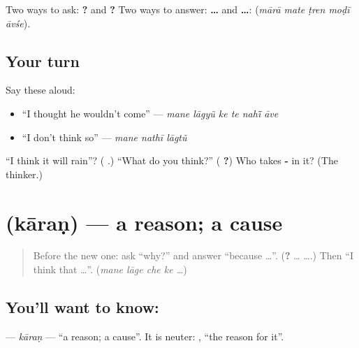Two ways to ask: \textbf{   ?} and \textbf{   ?} Two ways to answer: \textbf{    …} and \textbf{  …}: \textbf{    } (\emph{mārā mate ṭren moḍī āvśe}).

\subsection*{Your turn}
Say these aloud:

\begin{itemize}
\raggedright
  \item \textquotedblleft{}I thought he wouldn't come\textquotedblright{} — \emph{mane lāgyũ ke te nahī̃ āve}
  \item \textquotedblleft{}I don't think so\textquotedblright{} — \emph{mane nathī lāgtũ}
\end{itemize}

\begin{tcolorbox}[breakable,colback=teal!4,colframe=teal!35!black,title={Before you move on}]
\textquotedblleft{}I think it will rain\textquotedblright{}? (\textbf{     }.) \textquotedblleft{}What do you think?\textquotedblright{} (\textbf{   ?}) Who takes \textbf{-} in it? (The thinker.)
\end{tcolorbox}
\section[\texorpdfstring{\gu{કારણ} (kāraṇ)}{કારણ (kāraṇ)}]{ (kāraṇ) — a reason; a cause}

\label{lesson:GU-C277-karan}



\begin{quote}
Before the new one: ask \textquotedblleft{}why?\textquotedblright{} and answer \textquotedblleft{}because …\textquotedblright{}. (\textbf{?} … \textbf{} ….) Then \textquotedblleft{}I think that …\textquotedblright{}. (\emph{mane lāge che ke …})
\end{quote}

\subsection*{You'll want to know: }
\textbf{} — \emph{kāraṇ} — \textquotedblleft{}a reason; a cause\textquotedblright{}. It is neuter: \textbf{ }, \textquotedblleft{}the reason for it\textquotedblright{}.

